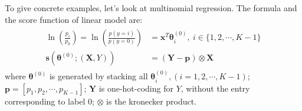 \documentclass[twoside,11pt]{article}
\begin{document}
To give concrete examples, let's look at  multinomial  regression. The formula and the score function of linear model are:
\begin{align}
\begin{aligned}
\ln (\frac{p_i}{p_0}) = \ln (\frac{p(y=i)}{p(y=0)})&=\bm {x}^{T} \bm { \theta}_i^{(0)}, ~ i \in \{1,2,\cdots,K-1\} \\
\bm {s}(\bm { \theta} ^{ (0)}; (\bm {X}, Y)) &= (\bm {Y}-\bm {p})\otimes \bm {X}
\end{aligned}
\label{eqn:multi_score}
\end{align}
where $\bm { \theta} ^{ (0)}$ is generated by stacking all $ \bm { \theta}_i ^{(0)}, (i=1,2,\cdots,K-1)$; $\bm {p}=[p_1, p_2, \cdots, p _{K-1}]$; $\bm {Y}$ is one-hot-coding for $Y$, without the entry corresponding to label $0$; $\otimes$ is the kronecker product. 

\end{document}
